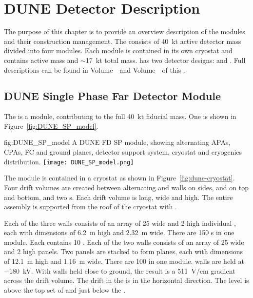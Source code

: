 \chapter{DUNE Detector Description}
\label{vl:tc-dune_overview}


The purpose of this chapter is to provide an overview description of
the   modules and their construction
management. The  consists of \SI{40}{\kilo\tonne} active
detector mass divided into four modules. Each module is contained in
its own cryostat and contains \nominalmodsize active mass and
$\sim$\SI{17}{\kilo\tonne} total mass.  has two detector designs:
 and .  Full descriptions can be found in
 Volume~\volnumbersp\ and  Volume~\volnumberdp\
of this .

\section{DUNE Single Phase Far Detector Module}
\label{sec:fdsp-SP-module}

The   is a \nominalmodsize module,
contributing to the full \SI{40}{\kilo\tonne}  fiducial
mass.  One \nominalmodsize \dword{spmod} is shown in
Figure~\ref{fig:DUNE_SP_model}.
\begin{dunefigure}
{fig:DUNE_SP_model} 
{A \nominalmodsize DUNE FD SP module, showing alternating APAs,
    CPAs, FC and ground planes, detector support system, cryostat
    and cryogenics distribution.}
  \texttt{[image: DUNE\_SP\_model.png]}
\end{dunefigure} 

The module is contained in a cryostat as shown in
Figure~\ref{fig:dune-cryostat}.  Four drift volumes are created
between alternating  and  walls on sides,
 and  on top and bottom, and two \endwall{}s.
Each drift volume is \sptpclen long, \spmaxdrift wide and \tpcheight
high.  The entire assembly is supported from the roof of the cryostat
with \dword{dss}.

Each of the three  walls consists of an array of \num{25}
wide and \num{2} high individual \dwords{apa}, each with dimensions of
\SI{6.2}{\meter} high and \SI{2.32}{\meter} wide. There are \num{150}
s in one module. Each \dword{apa} contains \num{10}
. Each of the two  walls consists of an array of
\num{25} wide and \num{2} high \dword{cpa} panels. Two panels are
stacked to form planes, each with dimensions of \SI{12.1}{\meter} high
and \SI{1.16}{\meter} wide. There are \num{100} \dwords{cpa} in one
module.  \dword{cpa} walls are held at $-$\SI{180}{\kilo\volt}. With
\dword{apa} walls held close to ground, the result is a
\SI{511}{\volt/\centi\meter} gradient across the drift volume. The
drift in the \dword{spmod} is in the horizontal direction. The
 level is above the top set of  and just below
the \dword{dss}.

